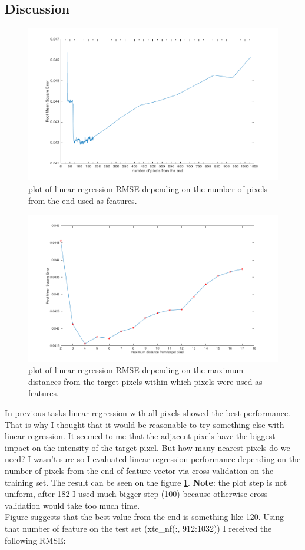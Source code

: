 \documentclass{article}
\begin{document}
		\subsection{Discussion}
		 	\begin{figure}[t]
		 		\centering
		 		\includegraphics[width=16cm]{images/p1-6_num_pixels.png}
		 		\caption{plot of linear regression RMSE depending on the number of pixels from the end  used as features.}
		 		\label{fig:p1-6_num_pixels}
		 	\end{figure}
		 	\begin{figure}[t]
		 		\centering
		 		\includegraphics[width=16cm]{images/p1-6_closest_pixels.png}
		 		\caption{plot of linear regression RMSE depending on the maximum distances from the target pixels within which pixels were  used as features.}
		 		\label{fig:p1-6_closest_pixels}	
		 	\end{figure}
		 	In previous tasks linear regression with all pixels showed the best performance. That is why I thought that it would be reasonable to try something else with linear regression. It seemed to me that the adjacent pixels have the biggest impact on the intensity of the target pixel. But how many nearest pixels do we need? I wasn't sure so I evaluated linear regression performance depending on the number of pixels from the end of feature vector via cross-validation on the training set. The result can be seen on the figure \ref{fig:p1-6_num_pixels}. \textbf{Note}: the plot step is not uniform, after 182 I used much bigger step (100) because otherwise cross-validation would take too much time.\\ Figure suggests that the best value from the end is something like 120. Using that number of feature on the test set (xte\_nf(:, 912:1032)) I received the following RMSE:
\end{document}
